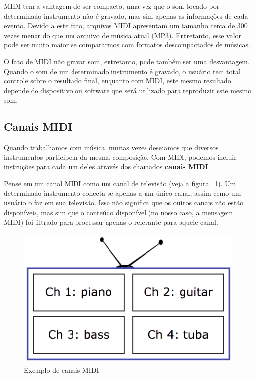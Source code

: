             MIDI tem a vantagem de ser compacto, uma vez que o som tocado por determinado instrumento não é gravado, mas sim apenas as informações de cada evento. Devido a este fato, arquivos MIDI apresentam um tamanho cerca de 300 vezes menor do que um arquivo de música atual (MP3). Entretanto, esse valor pode ser muito maior se compararmos com formatos descompactados de músicas.

            O fato de MIDI não gravar som, entretanto, pode também ser uma desvantagem. Quando o som de um determinado instrumento é gravado, o usuário tem total controle sobre o resultado final, enquanto com MIDI, este mesmo resultado depende do dispositivo ou software que será utilizado para reproduzir este mesmo som.

        \subsection{Canais MIDI}

            Quando trabalhamos com música, muitas vezes desejamos que diversos instrumentos participem da mesma composição. Com MIDI, podemos incluir instruções para cada um deles através dos chamados \textbf{canais MIDI}.

            Pense em um canal MIDI como um canal de televisão (veja a figura ~\ref{fig:midi-channels}). Um determinado instrumento conecta-se apenas a um único canal, assim como um usuário o faz em sua televisão. Isso não significa que os outros canais não estão disponíveis, mas sim que o conteúdo disponível (no nosso caso, a mensagem MIDI) foi filtrado para processar apenas o relevante para aquele canal.

            \begin{figure}[H]
            	\centering
            	\includegraphics[scale=0.6]{Imagens/midi-channels.png}
            	\caption[Exemplo de canais MIDI]{Exemplo de canais MIDI ~\cite{Gibson2013}}
            	\label{fig:midi-channels}
            \end{figure}


